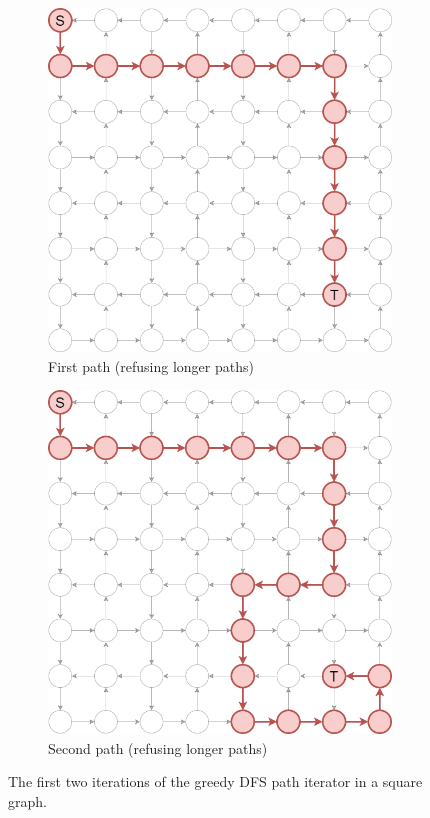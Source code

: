 \documentclass[12pt, oneside]{report}
\theoremstyle{plain}
\theoremstyle{definition}
\theoremstyle{indented}
\begin{document}
\begin{appendices}
\begin{figure}[ht]
\begin{subfigure}{.5\textwidth}
  \centering
\includegraphics[width=0.8\linewidth]{images/pathiterators/examples-Greedy DFS-1.png}
  \caption{First path (refusing longer paths)}
\end{subfigure}
\begin{subfigure}{.5\textwidth}
  \centering
\includegraphics[width=0.8\linewidth]{images/pathiterators/examples-Greedy DFS-reflongerpaths.png}
  \caption{Second path (refusing longer paths)}
\end{subfigure}
\caption{The first two iterations of the greedy DFS path iterator in a square graph.}
\label{fig:pathexamples-greedydfs}
\end{figure}


\end{appendices}
\end{document}
